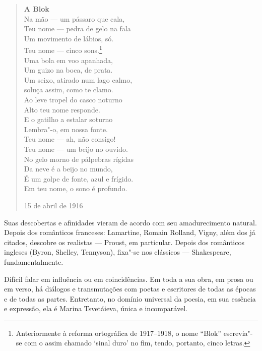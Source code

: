 \begin{verse}
\textbf{A Blok} \\[8pt]
Na mão --- um pássaro que cala, \\
Teu nome --- pedra de gelo na fala \\
Um movimento de lábios, só. \\
Teu nome --- cinco sons.\footnote{Anteriormente à reforma ortográfica de 1917--1918, o nome ``Blok'' escrevia"-se com o assim chamado `sinal duro' no fim, tendo, portanto, cinco letras.} \\
Uma bola em voo apanhada, \\
Um guizo na boca, de prata. \\[8pt]
Um seixo, atirado num lago calmo, \\
soluça assim, como te clamo. \\
Ao leve tropel do casco noturno \\
Alto teu nome responde. \\
E o gatilho a estalar soturno \\
Lembra"-o, em nossa fonte. \\[8pt]
Teu nome --- ah, não consigo! \\
Teu nome --- um beijo no ouvido. \\
No gelo morno de pálpebras rígidas \\
Da neve é a beijo no mundo, \\
É um golpe de fonte, azul e frígido. \\
Em teu nome, o sono é profundo. 

15 de abril de 1916

\end{verse}

Suas descobertas e afinidades vieram de acordo com seu
amadurecimento natural. Depois dos românticos franceses:
Lamartine, Romain Rolland, Vigny, além dos já citados, descobre
os realistas --- Proust, em particular. Depois dos românticos
ingleses (Byron, Shelley, Tennyson), fixa"-se nos clássicos ---
Shakespeare, fundamentalmente.

Difícil falar em influência ou em coincidências. Em toda a sua
obra, em prosa ou em verso, há diálogos e transmutações com poetas
e escritores de todas as épocas e de todas as partes. Entretanto,
no domínio universal da poesia, em sua essência e expressão, ela
é Marina Tsvetáieva, única e incomparável.


